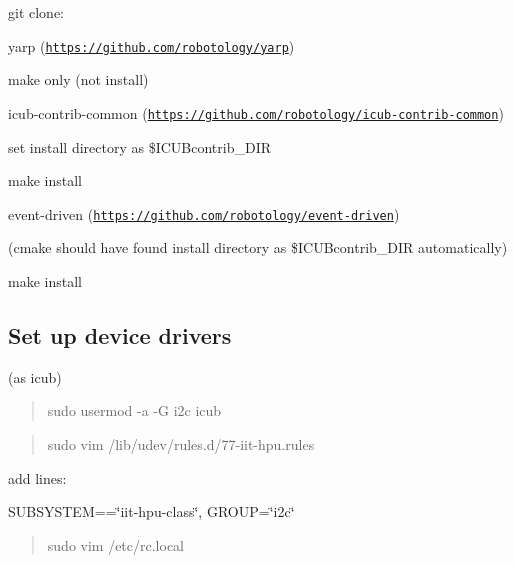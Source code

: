 git clone\+:

yarp (\href{https://github.com/robotology/yarp}{\tt https\+://github.\+com/robotology/yarp})


\begin{DoxyItemize}
\item make only (not install)
\end{DoxyItemize}

icub-\/contrib-\/common (\href{https://github.com/robotology/icub-contrib-common}{\tt https\+://github.\+com/robotology/icub-\/contrib-\/common})


\begin{DoxyItemize}
\item set install directory as \$\+I\+C\+U\+Bcontrib\+\_\+\+D\+IR
\item make install
\end{DoxyItemize}

event-\/driven (\href{https://github.com/robotology/event-driven}{\tt https\+://github.\+com/robotology/event-\/driven})


\begin{DoxyItemize}
\item (cmake should have found install directory as \$\+I\+C\+U\+Bcontrib\+\_\+\+D\+IR automatically)
\item make install
\end{DoxyItemize}

\subsection*{Set up device drivers}

(as icub)

\begin{quote}
sudo usermod -\/a -\/G i2c icub \end{quote}


\begin{quote}
sudo vim /lib/udev/rules.d/77-\/iit-\/hpu.\+rules \end{quote}


add lines\+:


\begin{DoxyItemize}
\item S\+U\+B\+S\+Y\+S\+T\+EM==\char`\"{}iit-\/hpu-\/class\char`\"{}, G\+R\+O\+UP=\char`\"{}i2c\char`\"{}
\end{DoxyItemize}

\begin{quote}
sudo vim /etc/rc.local \end{quote}


